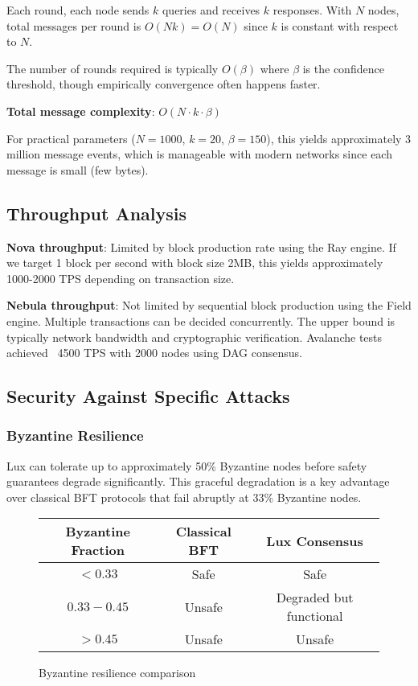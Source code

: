 Each round, each node sends $k$ queries and receives $k$ responses. With $N$ nodes, total messages per round is $O(Nk) = O(N)$ since $k$ is constant with respect to $N$.

The number of rounds required is typically $O(\beta)$ where $\beta$ is the confidence threshold, though empirically convergence often happens faster.

\textbf{Total message complexity}: $O(N \cdot k \cdot \beta)$

For practical parameters ($N=1000$, $k=20$, $\beta=150$), this yields approximately 3 million message events, which is manageable with modern networks since each message is small (few bytes).

\subsection{Throughput Analysis}

\textbf{Nova throughput}: Limited by block production rate using the Ray engine. If we target 1 block per second with block size 2MB, this yields approximately 1000-2000 TPS depending on transaction size.

\textbf{Nebula throughput}: Not limited by sequential block production using the Field engine. Multiple transactions can be decided concurrently. The upper bound is typically network bandwidth and cryptographic verification. Avalanche tests achieved ~4500 TPS with 2000 nodes using DAG consensus.

\subsection{Security Against Specific Attacks}

\subsubsection{Byzantine Resilience}

Lux can tolerate up to approximately 50\% Byzantine nodes before safety guarantees degrade significantly. This graceful degradation is a key advantage over classical BFT protocols that fail abruptly at 33\% Byzantine nodes.

\begin{figure}[h]
\centering
\begin{tabular}{|c|c|c|}
\hline
Byzantine Fraction & Classical BFT & Lux Consensus \\
\hline
$< 0.33$ & Safe & Safe \\
$0.33 - 0.45$ & Unsafe & Degraded but functional \\
$> 0.45$ & Unsafe & Unsafe \\
\hline
\end{tabular}
\caption{Byzantine resilience comparison}
\end{figure}

